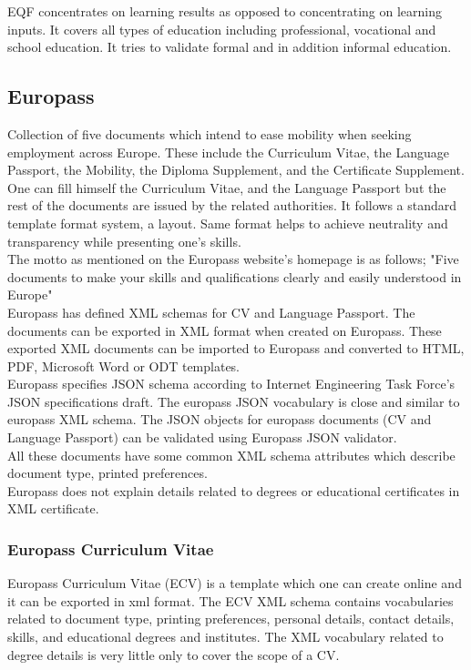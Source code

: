 \documentclass[12pt,a4paper,oneside]{book}
\begin{document}
    EQF concentrates on learning results as opposed to concentrating on learning inputs. It covers all types of education including professional, vocational and school education. It tries to validate formal and in addition informal education. \\

    \subsection{Europass}
    Collection of five documents which intend to ease mobility when seeking employment across Europe. These include the Curriculum Vitae, the Language Passport, the Mobility, the Diploma Supplement, and the Certificate Supplement. One can fill himself the Curriculum Vitae, and the Language Passport but the rest of the documents are issued by the related authorities. It follows a standard template format system, a layout. Same format helps to achieve neutrality and transparency while presenting one's skills. \\

    The motto as mentioned on the Europass website's homepage is as follows;
    "Five documents to make your skills and qualifications clearly and easily understood in Europe" \\

    Europass has defined XML schemas for CV and Language Passport. The documents can be exported in XML format when created on Europass. These exported XML documents can be imported to Europass and converted to HTML, PDF, Microsoft Word or ODT templates. \\

    Europass specifies JSON schema according to Internet Engineering Task Force's JSON specifications draft. The europass JSON vocabulary is close and similar to europass XML schema. The JSON objects for europass documents (CV and Language Passport) can be validated using Europass JSON validator. \\

    All these documents have some common XML schema attributes which describe document type, printed preferences. \\

    Europass does not explain details related to degrees or educational certificates in XML certificate. \\

        \subsubsection{Europass Curriculum Vitae}
        Europass Curriculum Vitae (ECV) is a template which one can create online and it can be exported in xml format. The ECV XML schema contains vocabularies related to document type, printing preferences, personal details, contact details, skills, and educational degrees and institutes. The XML vocabulary related to degree details is very little only to cover the scope of a CV. \\
\end{document}
